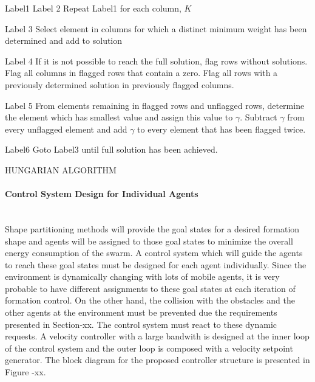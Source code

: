 \documentclass[twoside]{article}
\begin{document}
	\begin{algorithm}[H]
	
	     Label1  \;
	   Label 2  \; 
	   {Repeat Label1 for each column, $K$}
   
      Label 3  \; 
      Select element in columns for which a distinct minimum weight has been determined and add to solution
     
     Label 4 \;
     If it is not possible to reach the full solution, flag rows without solutions. Flag all columns in flagged rows that contain a zero. Flag all rows with a previously determined solution in previously flagged columns.
     
     Label 5 \;
     From elements remaining in flagged rows and unflagged rows, determine the element which has smallest value and assign this value to $\gamma$. Subtract $\gamma$  from every unflagged element and add  $\gamma$ to every element that has been flagged twice.
     
     Label6 \;
     Goto Label3 until full solution has been achieved.
     
     		\caption{HUNGARIAN ALGORITHM}
		\end{algorithm}
	
	\paragraph{Control System Design for Individual Agents}\hspace{0pt} \\
Shape partitioning methods will provide the goal states for a desired formation shape and agents will be assigned to those goal states to minimize the overall energy consumption of the swarm. A control system which will guide the agents to reach these goal states must be designed for each agent individually. Since the environment is dynamically changing with lots of  mobile agents, it is very probable to have different assignments to these goal states at each iteration of formation control. On the other hand, the collision with the obstacles and the other agents at the environment must be prevented due the requirements presented in Section-xx. The control system must react to these dynamic requests. A velocity controller with a large bandwith is designed at the inner loop of the control system and the outer loop is composed with a velocity setpoint generator. The block diagram for the proposed controller structure is presented in Figure -xx.
\end{document}
